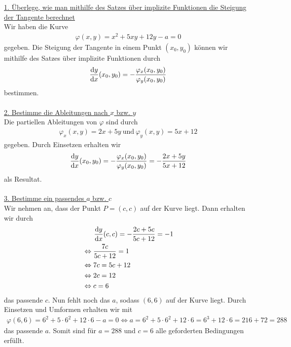\underline{1. Überlege, wie man mithilfe des Satzes über implizite Funktionen die Steigung der Tangente berechnet}\\
Wir haben die Kurve
\begin{align*}
\varphi(x,y) = x^2+5xy+12y-a=0
\end{align*}
gegeben. Die Steigung der Tangente in einem Punkt $(x_0,y_0)$ können wir mithilfe des Satzes über implizite Funktionen durch
\begin{align*}
\frac{\text{\rmfamily d} y}{\text{\rmfamily d} x}(x_0,y_0)  
= -\frac{\varphi_x(x_0,y_0)}{\varphi_y(x_0,y_0)}
\end{align*}
bestimmen.
\\
\\
\underline{2. Bestimme die Ableitungen nach $x$ bzw. $y$}\\
Die partiellen Ableitungen von $\varphi$ sind durch
\begin{align*}
\varphi_x(x,y) = 2x +5y \ 
\text{und} \
\varphi_y(x,y) = 5x + 12
\end{align*}
gegeben. Durch Einsetzen erhalten wir 
\begin{align*}
\frac{\text{\rmfamily d} y}{\text{\rmfamily d} x}(x_0,y_0)  
= -\frac{\varphi_x(x_0,y_0)}{\varphi_y(x_0,y_0)}
=-\frac{2x+5y}{5x+12}
\end{align*}
als Resultat.\\
\\
\underline{3. Bestimme ein passendes $a$ bzw. $c$}\\
Wir nehmen an, dass der Punkt $P = (c,c)$ auf der Kurve liegt.
Dann erhalten wir durch
\begin{align*}
&\ \ \ \  \ \frac{\text{\rmfamily d} y}{\text{\rmfamily d} x}(c,c)
= - \frac{2c+5c}{5c+12} = -1\\
&\Leftrightarrow
  \frac{7c}{5c+12} = 1\\
&\Leftrightarrow
7c = 5c +12\\
&\Leftrightarrow
2c = 12\\
&\Leftrightarrow
c= 6
\end{align*}
das passende $c$.
Nun fehlt noch das $a$, sodass $(6,6)$ auf der Kurve liegt.
Durch Einsetzen und Umformen erhalten wir mit
\begin{align*}
\varphi(6,6) = 6^2 +5\cdot 6^2  + 12 \cdot 6 -a = 0
\Leftrightarrow
a = 6^2 +5\cdot 6^2  + 12 \cdot 6
=6^3 + 12 \cdot 6 = 216 + 72 = 288
\end{align*}
das passende $a$.
Somit sind für $a = 288$ und $c = 6$ alle geforderten Bedingungen erfüllt.
\\
\\
